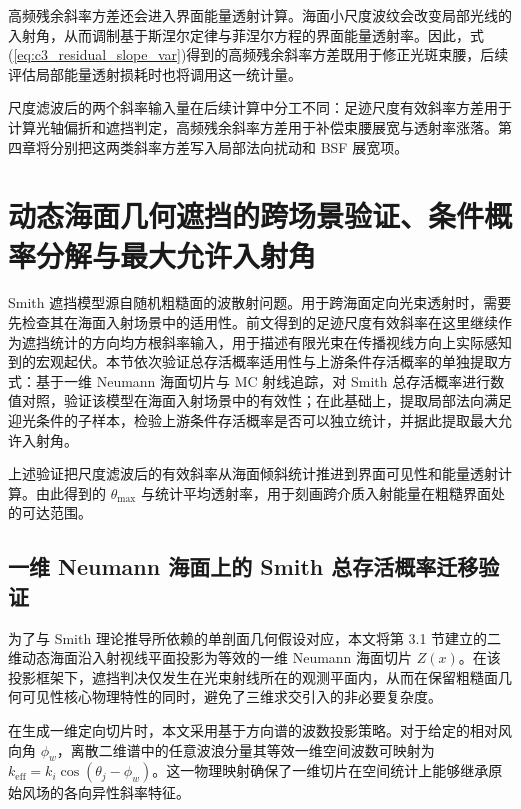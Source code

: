 高频残余斜率方差还会进入界面能量透射计算。海面小尺度波纹会改变局部光线的入射角，从而调制基于斯涅尔定律与菲涅尔方程的界面能量透射率。因此，式(\ref{eq:c3_residual_slope_var})得到的高频残余斜率方差既用于修正光斑束腰，后续评估局部能量透射损耗时也将调用这一统计量。

尺度滤波后的两个斜率输入量在后续计算中分工不同：足迹尺度有效斜率方差用于计算光轴偏折和遮挡判定，高频残余斜率方差用于补偿束腰展宽与透射率涨落。第四章将分别把这两类斜率方差写入局部法向扰动和 BSF 展宽项。

\section{动态海面几何遮挡的跨场景验证、条件概率分解与最大允许入射角}
\label{sec:shadowing_decoupling}

Smith 遮挡模型源自随机粗糙面的波散射问题。用于跨海面定向光束透射时，需要先检查其在海面入射场景中的适用性。前文得到的足迹尺度有效斜率在这里继续作为遮挡统计的方向均方根斜率输入，用于描述有限光束在传播视线方向上实际感知到的宏观起伏。本节依次验证总存活概率适用性与上游条件存活概率的单独提取方式：基于一维 Neumann 海面切片与 MC 射线追踪，对 Smith 总存活概率进行数值对照，验证该模型在海面入射场景中的有效性；在此基础上，提取局部法向满足迎光条件的子样本，检验上游条件存活概率是否可以独立统计，并据此提取最大允许入射角。

上述验证把尺度滤波后的有效斜率从海面倾斜统计推进到界面可见性和能量透射计算。由此得到的 $\theta_{\max}$ 与统计平均透射率，用于刻画跨介质入射能量在粗糙界面处的可达范围。

\subsection{一维 Neumann 海面上的 Smith 总存活概率迁移验证}
\label{subsec:smith_migration_validation}

为了与 Smith 理论推导所依赖的单剖面几何假设对应，本文将第 3.1 节建立的二维动态海面沿入射视线平面投影为等效的一维 Neumann 海面切片 $Z(x)$。在该投影框架下，遮挡判决仅发生在光束射线所在的观测平面内，从而在保留粗糙面几何可见性核心物理特性的同时，避免了三维求交引入的非必要复杂度。

在生成一维定向切片时，本文采用基于方向谱的波数投影策略。对于给定的相对风向角 $\phi_w$，离散二维谱中的任意波浪分量其等效一维空间波数可映射为 $k_{\mathrm{eff}} = k_i \cos(\theta_j - \phi_w)$。这一物理映射确保了一维切片在空间统计上能够继承原始风场的各向异性斜率特征。

